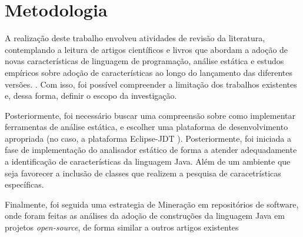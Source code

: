 %


\section{Metodologia}
    
    A realização deste trabalho envolveu atividades de revisão da literatura, contemplando a leitura de artigos científicos e livros que abordam a adoção de novas características de linguagem de programação, análise estática e estudos empíricos sobre adoção de características ao longo do lançamento das diferentes versões. \cite{Schaefer:ACM2009,Parnin:ACM2011,Overbey:2009,bonifacio:scam2015}. Com isso, foi possível compreender a limitação dos trabalhos existentes e, dessa forma, definir o escopo da investigação. 
    
    Posteriormente, foi necessário buscar uma compreensão sobre como implementar ferramentas de 
    análise estática, e escolher uma plataforma de desenvolvimento apropriada (no caso, a plataforma Eclipse-JDT \cite{EclipseJDT}). Posteriormente, foi iniciada a fase de implementação do analisador estático de forma a atender adequadamente a identificação de características da linguagem Java. Além de um ambiente que seja favorecer a inclusão de classes que realizem a pesquisa de caracetrísticas específicas.   
     
    Finalmente, foi seguida uma estrategia de Mineração em repositórios de software, onde foram feitas as análises da adoção de construções da linguagem Java em projetos \textit{open-source}, de forma similar a outros artigos existentes~\cite{pinto-jss:2015,Schaefer:ACM2009, Schaefer:ACM2010, Overbey:2009}
     